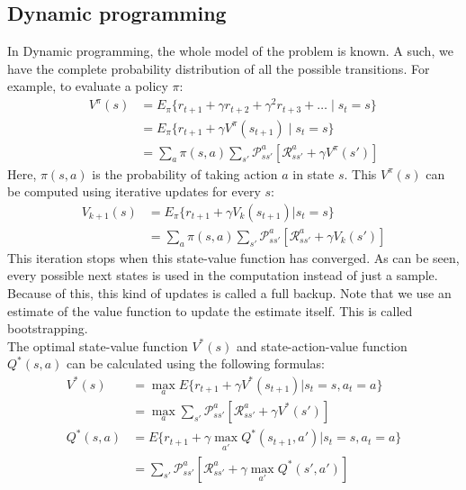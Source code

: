\documentclass[a4paper]{article}
\begin{document}
\subsection{Dynamic programming}
In Dynamic programming, the whole model of the problem is known. A such, we have the complete probability distribution of all the possible transitions. For example, to evaluate a policy $\pi$:
\begin{align}
V^{\pi}(s) &= E_{\pi} \{r_{t+1} + \gamma r_{t+2} + \gamma^2r_{t+3}+\dots \mid s_t=s\}\\
&= E_{\pi} \{r_{t+1} + \gamma V^{\pi}(s_{t+1}) \mid s_t=s\}\\
&= \sum_a \pi(s,a) \sum_{s'} \mathcal{P}^a_{ss'} [\mathcal{R}^a_{ss'} + \gamma V^{\pi}(s')]
\end{align}
Here, $\pi(s,a)$ is the probability of taking action $a$ in state $s$. This $V^{\pi}(s)$ can be computed using iterative updates for every $s$:
\begin{align}
V_{k+1}(s) &= E_{\pi}\{r_{t+1} + \gamma V_k(s_{t+1}) \vert s_t=s\}\\
&= \sum_a \pi(s,a) \sum_{s'}\mathcal{P}^a_{ss'} [\mathcal{R}^a_{ss'} + \gamma V_k(s')]
\end{align}
This iteration stops when this state-value function has converged. As can be seen, every possible next states is used in the computation instead of just a sample. Because of this, this kind of updates is called a full backup.
Note that we use an estimate of the value function to update the estimate itself. This is called bootstrapping.\\
The optimal state-value function $V^*(s)$ and state-action-value function $Q^*(s,a)$ can be calculated using the following formulas:
\begin{align}
V^{*}(s) &= \max_a E\{r_{t+1} + \gamma V^{*}(s_{t+1}) \vert s_t = s, a_t = a\}\\
&= \max_a \sum_{s'} \mathcal{P}^a_{ss'} [\mathcal{R}^a_{ss'}+\gamma V^{*}(s')]\\
Q^{*}(s,a) &= E\{r_{t+1} + \gamma \max_{a'} Q^{*}(s_{t+1},a') \vert s_t=s, a_t=a\}\\
&= \sum_{s'} \mathcal{P}^a_{ss'} [\mathcal{R}^a_{ss'}+\gamma \max_{a'} Q^{*}(s',a')]
\end{align}
\end{document}
